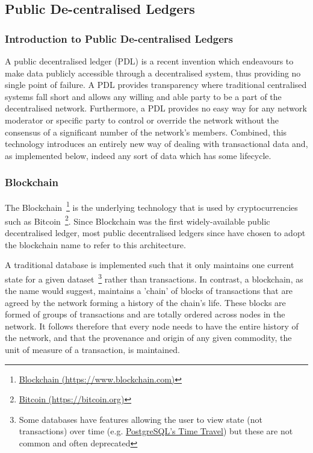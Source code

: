 \subsection{Public De-centralised Ledgers}

\subsubsection{Introduction to Public De-centralised Ledgers}

A public decentralised ledger (PDL) is a recent invention which endeavours to make data publicly accessible through a decentralised system, thus providing no single point of failure. A PDL provides transparency where traditional centralised systems fall short and allows any willing and able party to be a part of the decentralised network. Furthermore, a PDL provides no easy way for any network moderator or specific party to control or override the network without the consensus of a significant number of the network's members. Combined, this technology introduces an entirely new way of dealing with transactional data and, as implemented below, indeed any sort of data which has some lifecycle.


\subsubsection{Blockchain}

The Blockchain~\footnote{\href{https://www.blockchain.com/}{Blockchain (https://www.blockchain.com)}} is the underlying technology that is used by cryptocurrencies such as Bitcoin~\footnote{\href{https://bitcoin.org/en/}{Bitcoin (https://bitcoin.org)}}. Since Blockchain was the first widely-available public decentralised ledger, most public decentralised ledgers since have chosen to adopt the blockchain name to refer to this architecture.

A traditional database is implemented such that it only maintains one current state for a given dataset~\footnote{Some databases have features allowing the user to view state (not transactions) over time (e.g. \href{https://www.postgresql.org/docs/6.3/static/c0503.htm}{PostgreSQL's Time Travel}) but these are not common and often deprecated} rather than transactions. In contrast, a blockchain, as the name would suggest, maintains a 'chain' of blocks of transactions that are agreed by the network forming a history of the chain's life. These blocks are formed of groups of transactions and are totally ordered across nodes in the network. It follows therefore that every node needs to have the entire history of the network, and that the provenance and origin of any given commodity, the unit of measure of a transaction, is maintained.

